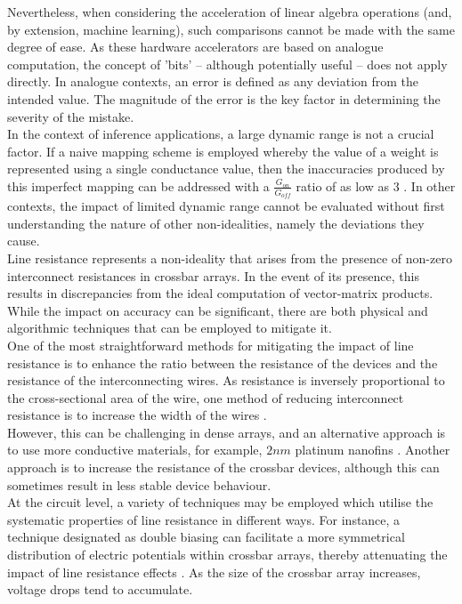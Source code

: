 \noindent Nevertheless, when considering the acceleration of linear algebra operations (and, by extension, machine learning), such comparisons cannot be made with the same degree of ease. As these hardware accelerators are based on analogue computation, the concept of 'bits' – although potentially useful – does not apply directly. In analogue contexts, an error is defined as any deviation from the intended value. The magnitude of the error is the key factor in determining the severity of the mistake. \\

\noindent In the context of inference applications, a large dynamic range is not a crucial factor. If a naive mapping scheme is employed whereby the value of a weight is represented using a single conductance value, then the inaccuracies produced by this imperfect mapping can be addressed with a $\frac{G_{on}}{G_{off}}$ ratio of as low as 3 \cite{mehonic2019simulation}. In other contexts, the impact of limited dynamic range cannot be evaluated without first understanding the nature of other non-idealities, namely the deviations they cause.\\

\noindent Line resistance represents a non-ideality that arises from the presence of non-zero interconnect resistances in crossbar arrays. In the event of its presence, this results in discrepancies from the ideal computation of vector-matrix products. While the impact on accuracy can be significant, there are both physical and algorithmic techniques that can be employed to mitigate it. \\

\noindent One of the most straightforward methods for mitigating the impact of line resistance is to enhance the ratio between the resistance of the devices and the resistance of the interconnecting wires. As resistance is inversely proportional to the cross-sectional area of the wire, one method of reducing interconnect resistance is to increase the width of the wires \cite{li2017three}.\\

\noindent However, this can be challenging in dense arrays, and an alternative approach is to use more conductive materials, for example, $2nm$ platinum nanofins \cite{pi2019memristor}. Another approach is to increase the resistance of the crossbar devices, although this can sometimes result in less stable device behaviour. \\

\noindent At the circuit level, a variety of techniques may be employed which utilise the systematic properties of line resistance in different ways. For instance, a technique designated as double biasing can facilitate a more symmetrical distribution of electric potentials within crossbar arrays, thereby attenuating the impact of line resistance effects \cite{hu2016dot}. As the size of the crossbar array increases, voltage drops tend to accumulate. \\

